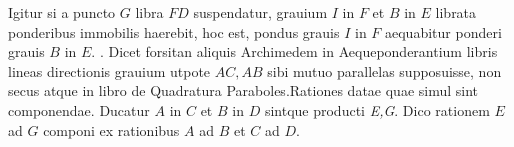 \pend 
\pstart  [p. 9] Igitur si a puncto $G$ libra $FD$ suspendatur, grauium $I$ in $F$ et $B$ in $E$ librata ponderibus immobilis haerebit, hoc est, pondus grauis $I$ in $F$ aequabitur ponderi grauis $B$ in $E$.
\pend 
\pstart  [p. 11] . Dicet forsitan aliquis Archimedem in Aequeponderantium libris lineas directionis grauium utpote $AC, AB$ sibi mutuo parallelas supposuisse, non secus atque in libro de Quadratura Paraboles\protect{}.\pend \pstart [p. 23] Rationes datae  quae simul sint componendae. Ducatur $A$ in $C$ et $B$ in $D$ sintque producti \textit{E,G}. Dico rationem $E$ ad $G$ componi ex rationibus $A$ ad $B$ et $C$ ad $D$.
\pend
\count{}
 


 


 


 

